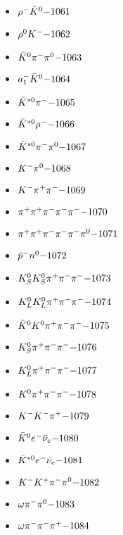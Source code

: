 \begin{multicols}{3}
\begin{itemize}
 \item $ \rho^{-} \bar{K}^{0} \hfill{-1061}$
 \item $ \rho^{0} K^{-} \hfill{-1062}$
 \item $ \bar{K}^{0} \pi^{-} \pi^{0} \hfill{-1063}$
 \item $ a_{1}^{-} \bar{K}^{0} \hfill{-1064}$
 \item $ \bar{K}^{*0} \pi^{-} \hfill{-1065}$
 \item $ \bar{K}^{*0} \rho^{-} \hfill{-1066}$
 \item $ \bar{K}^{*0} \pi^{-} \pi^{0} \hfill{-1067}$
 \item $ K^{-} \pi^{0} \hfill{-1068}$
 \item $ K^{-} \pi^{+} \pi^{-} \hfill{-1069}$
 \item $ \pi^{+} \pi^{+} \pi^{-} \pi^{-} \pi^{-} \hfill{-1070}$
 \item $ \pi^{+} \pi^{+} \pi^{-} \pi^{-} \pi^{-} \pi^{0} \hfill{-1071}$
 \item $ \bar{p}^{-} n^{0} \hfill{-1072}$
 \item $ K_{S}^{0} K_{S}^{0} \pi^{+} \pi^{-} \pi^{-} \hfill{-1073}$
 \item $ K_{L}^{0} K_{L}^{0} \pi^{+} \pi^{-} \pi^{-} \hfill{-1074}$
 \item $ \bar{K}^{0} K^{0} \pi^{+} \pi^{-} \pi^{-} \hfill{-1075}$
 \item $ K_{S}^{0} \pi^{+} \pi^{-} \pi^{-} \hfill{-1076}$
 \item $ K_{L}^{0} \pi^{+} \pi^{-} \pi^{-} \hfill{-1077}$
 \item $ K^{0} \pi^{+} \pi^{-} \pi^{-} \hfill{-1078}$
 \item $ K^{-} K^{-} \pi^{+} \hfill{-1079}$
 \item $ \bar{K}^{0} e^{-} \bar{\nu}_{e} \hfill{-1080}$
 \item $ \bar{K}^{*0} e^{-} \bar{\nu}_{e} \hfill{-1081}$
 \item $ K^{-} K^{+} \pi^{-} \pi^{0} \hfill{-1082}$
 \item $ \omega \pi^{-} \pi^{0} \hfill{-1083}$
 \item $ \omega \pi^{-} \pi^{-} \pi^{+} \hfill{-1084}$
 \end{itemize} 
 \end{multicols} 
